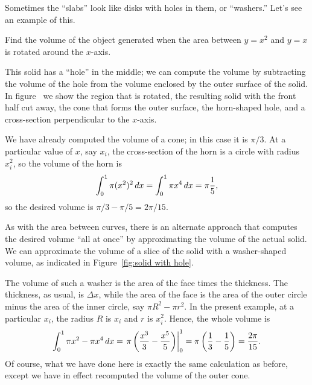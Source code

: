 Sometimes the ``slabs'' look like disks with holes in them, or
``washers.'' Let's see an example of this.


\begin{example}
Find the volume of the object generated when the area between $y=x^2$
and $y=x$ is rotated around the $x$-axis.
\end{example}

\begin{solution}
This solid has a
``hole'' in the middle; we can compute the volume by subtracting the
volume of the hole from the volume enclosed by the outer surface of
the solid. In figure~ we show the region
that is rotated, the resulting solid with the front half cut away,
the cone that forms the outer surface, the
horn-shaped hole, and a cross-section perpendicular to the $x$-axis.


We have already computed the volume of a cone; in this case it is
$\pi/3$. At a particular value of $x$, say $x_i$, the cross-section of
the horn is a circle with radius $x_i^2$, so the volume of the horn is
$$\int_0^1 \pi(x^2)^2\, d x=\int_0^1 \pi x^4\, d x=\pi{1\over 5},$$
so the desired volume is $\pi/3-\pi/5=2\pi/15$.

As with the area between curves, there is an alternate approach that
computes the desired volume ``all at once'' by approximating the
volume of the actual solid. We can approximate the volume of a slice
of the solid with a washer-shaped volume, as indicated in
Figure~\ref{fig:solid with hole}.

The volume of such a washer is the area of the face times the
thickness. The thickness, as usual, is $\Delta x$, while the area of
the face is the area of the outer circle minus the area of the inner
circle, say $\pi R^2-\pi r^2$. In the present example, at a particular $x_i$,
the radius $R$ is $x_i$ and $r$ is $x_i^2$. Hence, the whole volume is
$$
  \int_0^1 \pi x^2-\pi x^4\, d x=
  \left.\pi\left({x^3\over3}-{x^5\over5}\right)\right|_0^1=
  \pi\left({1\over3}-{1\over5}\right)={2\pi\over15}.
$$
Of course, what we have done here is exactly the same calculation as
before, except we have in effect recomputed the volume of the outer cone.
\end{solution}


